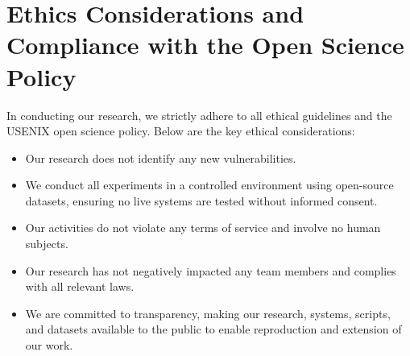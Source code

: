 \section{Ethics Considerations and Compliance with the Open Science Policy}
\label{sec:ethics}

In conducting our research, we strictly adhere to all ethical guidelines and the USENIX open science policy. Below are the key ethical considerations:

\begin{itemize}[leftmargin=*,itemsep=0.1em, parsep=0em, topsep=0em]
\item Our research does not identify any new vulnerabilities.
\item We conduct all experiments in a controlled environment using open-source datasets, ensuring no live systems are tested without informed consent.
\item Our activities do not violate any terms of service and involve no human subjects. 
\item Our research has not negatively impacted any team members and complies with all relevant laws. \item We are committed to transparency, making our research, systems, scripts, and datasets available to the public to enable reproduction and extension of our work. 
\end{itemize}
